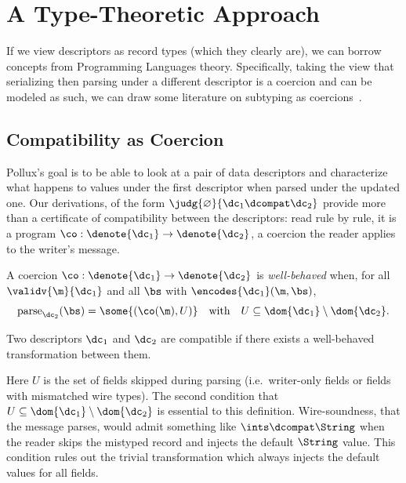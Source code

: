 \section{A Type-Theoretic Approach}\label{sec:type-theory}

If we view descriptors as record types (which they clearly are), we can borrow
concepts from Programming Languages theory. Specifically, taking the view that
serializing then parsing under a different descriptor is a coercion and can be
modeled as such, we can draw some literature on subtyping as
coercions~\cite{breazu-tannenInheritanceImplicitCoercion1991,brandtCoinductiveAxiomatizationRecursive1998}. 

\subsection{Compatibility as Coercion}

Pollux's goal is to be able to look at a pair of data descriptors and
characterize what happens to values under the first descriptor when parsed under
the updated one. Our derivations, of the form $\judg{\varnothing}{\dc_1 \dcompat \dc_2}$
provide more than a certificate of compatibility between the descriptors: read
rule by rule, it is a program $\co : \denote{\dc_1} \rightarrow \denote{\dc_2}$, a coercion the
reader applies to the writer's message.

\vspace{1em}
\begin{definition}\label{def:well-behaved}
  A coercion $\co : \denote{\dc_1} \to \denote{\dc_2}$ is \emph{well-behaved} when,
  for all $\validv{\m}{\dc_1}$ and all $\bs$ with $\encodes{\dc_1}(\m, \bs)$,
  \[ \mathrm{parse}_{\dc_2}(\bs) = \some{(\co(\m), U)} \quad\text{with}\quad
    U \subseteq \dom{\dc_1} \setminus \dom{\dc_2}. \]
\end{definition}

\vspace{1em}
\begin{definition}[Compatibility]\label{def:compat}
  Two descriptors $\dc_1$ and $\dc_2$ are compatible if there exists a well-behaved
  transformation between them. 
\end{definition}

Here $U$ is the set of fields skipped during parsing (i.e.\ writer-only fields or
fields with mismatched wire types). The second condition that
$U \subseteq \dom{\dc_1} \setminus \dom{\dc_2}$ is essential to this definition. Wire-soundness,
that the message parses, would admit something like $\ints \dcompat \String$ when the
reader skips the mistyped record and injects the default $\String$ value. This
condition rules out the trivial transformation which always injects the default
values for all fields.

